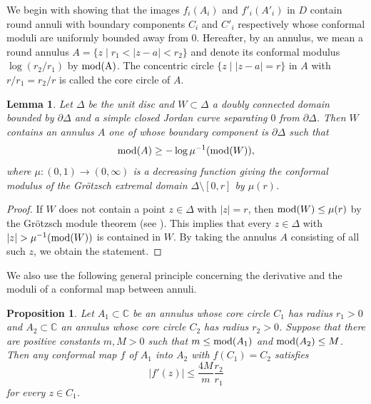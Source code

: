 \documentclass[12pt]{amsart}
\theoremstyle{plain}
\newtheorem{prop}[thm]{Proposition}
\newtheorem{lem}[thm]{Lemma}
\begin{document}
We begin with showing that the images $f_i(A_i)$ and $f'_i(A'_i)$ in $D$ contain round annuli with boundary components
$C_i$ and $C'_i$ respectively whose conformal moduli are uniformly bounded away from 0. Hereafter, by an annulus, we mean
a round annulus $A=\{z \mid r_1<|z-a|<r_2\}$ and denote its conformal modulus $\log(r_2/r_1)$ by $\rm mod(A)$.
The concentric circle $\{z \mid |z-a|=r\}$ in $A$ with $r/r_1=r_2/r$ is called the core circle of $A$.

\begin{lem}\label{grotzsch}
Let $\Delta$ be the unit disc and $W \subset \Delta$ a doubly connected domain bounded by
$\partial \Delta$ and a simple closed Jordan curve separating $0$ from $\partial \Delta$. 
Then $W$ contains an annulus $A$ 
one of whose boundary component is $\partial \Delta$ such that
$$
{\rm mod}(A) \geq -\log \mu^{-1}({\rm mod}(W)),
$$
where $\mu:(0,1) \to (0,\infty)$ is a decreasing function giving the conformal modulus of
the Gr\"otzsch extremal domain $\Delta \setminus [0,r]$ by $\mu(r)$.
\end{lem}

\begin{proof}
If $W$ does not contain a point $z \in \Delta$ with $|z|=r$, then ${\rm mod}(W) \leq \mu(r)$
by the Gr\"otzsch module theorem (see \cite[p.54]{LV}). This implies that every $z \in \Delta$ 
with $|z| >\mu^{-1}({\rm mod}(W))$ is contained in $W$. By taking the annulus $A$ consisting of all such $z$,
we obtain the statement.
\end{proof}

We also use the following general principle concerning the derivative and the moduli of a conformal map between annuli. 

\begin{prop}\label{annulus}
Let $A_1 \subset \mathbb C$ be an annulus whose core circle $C_1$ has radius $r_1>0$ and
$A_2 \subset \mathbb C$ an annulus whose core circle $C_2$ has radius $r_2>0$.
Suppose that there are positive constants $m, M>0$ such that 
$m \leq {\rm mod}(A_1)$ and ${\rm mod}(A_2) \leq M$. Then
any conformal map $f$ of $A_1$ into $A_2$  
with $f(C_1)=C_2$
satisfies 
$$
|f'(z)| \leq \frac{4M}{m} \frac{r_2}{r_1}
$$
for every $z \in C_1$.
\end{prop}
\end{document}

